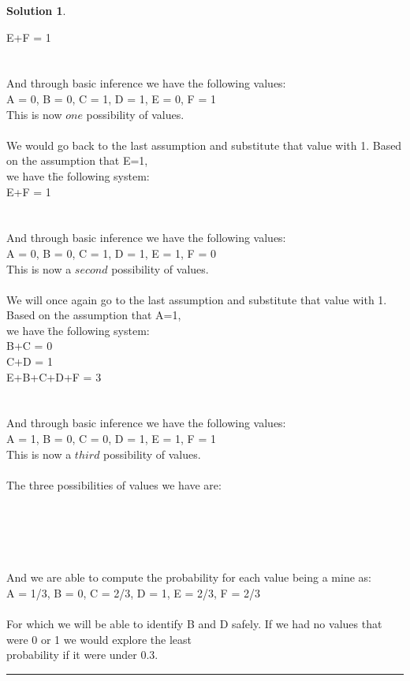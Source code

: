 \documentclass{article}
\theoremstyle{definition}
\def\fline{\rule{0.75\linewidth}{0.5pt}}
\newcommand{\finishline}{\vspace{-15pt}\begin{center}\fline\end{center}}
\newtheorem*{solution*}{Solution}
\newenvironment{solution}{\begin{solution*}}{{\finishline} \end{solution*}}
\begin{document}
\begin{solution}
\begin{tabbing}
	\>E+F = 1\=\\
    \\\\
    And through basic inference we have the following values: \\
    {A = 0, B = 0, C = 1, D = 1, E = 0, F = 1}\\
    This is now $one$ possibility of values. 
    \\\\
    We would go back to the last assumption and substitute that value with 1. Based on the assumption that E=1,\\ we have t\=he following system: \\
    \>E+F = 1\=\\
    \\\\
    And through basic inference we have the following values: \\
    {A = 0, B = 0, C = 1, D = 1, E = 1, F = 0}\\
    This is now a $second$ possibility of values. 
    \\\\
    We will once again go to the last assumption and substitute that value with 1. Based on the assumption that A=1,\\ we have \=the following system:\\
    
    \>B+C = 0 \\
	\>C+D = 1\\
	\>E+B+C+D+F = 3\=\\
     \\\\
    And through basic inference we have the following values: \\
    {A = 1, B = 0, C = 0, D = 1, E = 1, F = 1}\\
    This is now a $third$ possibility of values. \\\\
     
    The three possibilities of values we have are: \\\\
    \\
    \\
    \\
    
    \\And we are able to compute the probability for each value being a mine as: \\
    {A = 1/3, B = 0, C = 2/3, D = 1, E = 2/3, F = 2/3}\\\\
    
    For which we will be able to identify B and D safely. If we had no values that were 0 or 1 we would explore the least \\probability if it were under 0.3.
     
    
    \end{tabbing}
\end{solution}
\end{document}
